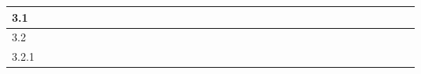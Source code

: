 \begin{table}[]
\begin{tabular}{|l|l|l|l|l|l|l|l|l|l|l|l|l|l|l|l|l|l|l|l|l|l|l|l|l|l|l|l|l|l|l|l|l|l|l|}
    3.1   &                                                 &                          &                          &                          & \cellcolor[HTML]{000000} &                          &                          &                          &                          &                          &                          &                          &                          &                          &                          &                          &                          &                          &                          &                          &                          &                          &                          &                          &                          &                          &                          &                          & \cellcolor[HTML]{000000} &                          &                          &                          & \cellcolor[HTML]{000000} & \cellcolor[HTML]{000000} \\ \hline
    3.2   & \cellcolor[HTML]{000000}                        & \cellcolor[HTML]{000000} & \cellcolor[HTML]{000000} & \cellcolor[HTML]{000000} &                          &                          & \cellcolor[HTML]{000000} & \cellcolor[HTML]{000000} & \cellcolor[HTML]{000000} &                          &                          & \cellcolor[HTML]{000000} & \cellcolor[HTML]{000000} & \cellcolor[HTML]{000000} &                          & \cellcolor[HTML]{000000} &                          &                          &                          &                          &                          &                          &                          & \cellcolor[HTML]{000000} &                          &                          & \cellcolor[HTML]{000000} &                          & \cellcolor[HTML]{000000} &                          &                          & \cellcolor[HTML]{000000} & \cellcolor[HTML]{000000} &                          \\ \hline
    3.2.1 & \cellcolor[HTML]{000000}                        & \cellcolor[HTML]{000000} & \cellcolor[HTML]{000000} &                          &                          &                          & \cellcolor[HTML]{000000} & \cellcolor[HTML]{000000} & \cellcolor[HTML]{000000} &                          &                          &                          & \cellcolor[HTML]{000000} & \cellcolor[HTML]{000000} &                          & \cellcolor[HTML]{FFFFFF} &                          &                          &                          &                          &                          &                          &                          &                          &                          &                          &                          &                          & \cellcolor[HTML]{000000} &                          &                          &                          &                          &                          \\ \hline

\end{tabular}
\end{table}
